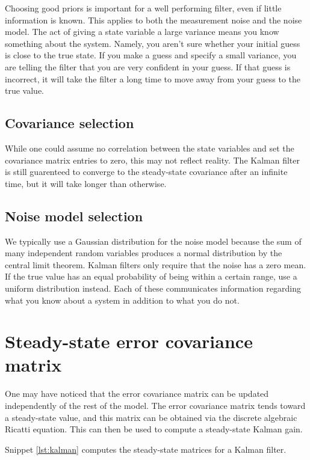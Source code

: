 Choosing good priors is important for a well performing filter, even if little
information is known. This applies to both the measurement noise and the noise
\gls{model}. The act of giving a state variable a large variance means you know
something about the system. Namely, you aren't sure whether your initial guess
is close to the true state. If you make a guess and specify a small variance,
you are telling the filter that you are very confident in your guess. If that
guess is incorrect, it will take the filter a long time to move away from your
guess to the true value.

\subsection{Covariance selection}

While one could assume no correlation between the state variables and set the
covariance matrix entries to zero, this may not reflect reality. The Kalman
filter is still guarenteed to converge to the steady-state covariance after an
infinite time, but it will take longer than otherwise.

\subsection{Noise model selection}

We typically use a Gaussian distribution for the noise \gls{model} because the
sum of many independent random variables produces a normal distribution by the
central limit theorem. Kalman filters only require that the noise has a zero
mean. If the true value has an equal probability of being within a certain
range, use a uniform distribution instead. Each of these communicates
information regarding what you know about a system in addition to what you do
not.

\section{Steady-state error covariance matrix}

One may have noticed that the error covariance matrix can be updated
independently of the rest of the model. The error covariance matrix tends
toward a steady-state value, and this matrix can be obtained via the discrete
algebraic Ricatti equation. This can then be used to compute a steady-state
Kalman gain.

Snippet \ref{lst:kalman} computes the steady-state matrices for a Kalman
filter.

